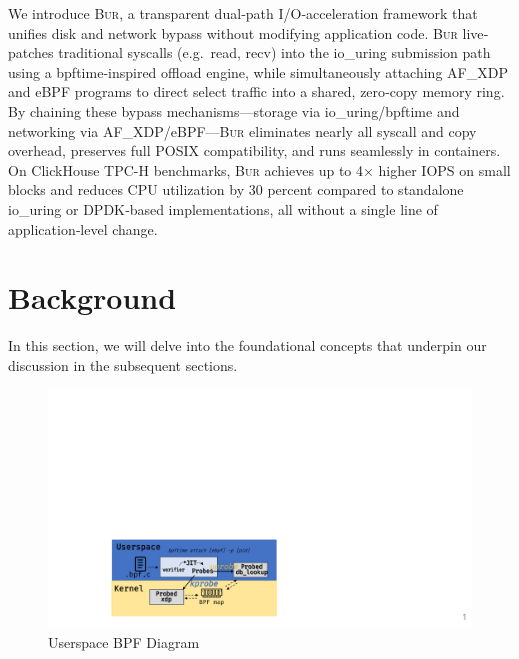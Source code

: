 \documentclass[sigconf,10pt]{acmart}
\newcommand{\sys}{\textsc{Bur}\xspace}
\begin{document}
We introduce \sys, a transparent dual‐path I/O‐acceleration framework that unifies disk and network bypass without modifying application code. \sys live‐patches traditional syscalls (e.g.\ read, recv) into the io\_uring submission path using a bpftime‐inspired offload engine, while simultaneously attaching AF\_XDP and eBPF programs to direct select traffic into a shared, zero‐copy memory ring. By chaining these bypass mechanisms—storage via io\_uring/bpftime and networking via AF\_XDP/eBPF—\sys eliminates nearly all syscall and copy overhead, preserves full POSIX compatibility, and runs seamlessly in containers. On ClickHouse TPC-H benchmarks, \sys achieves up to 4× higher IOPS on small blocks and reduces CPU utilization by 30 percent compared to standalone io\_uring or DPDK‐based implementations, all without a single line of application‐level change.

\section{Background}

In this section, we will delve into the foundational concepts that underpin our discussion in the subsequent sections.
\begin{figure}
\centering
\includegraphics[width=\columnwidth]{img/bpftime.pdf}
\caption{Userspace BPF Diagram}\label{fig:bpf}
\end{figure}
\end{document}
